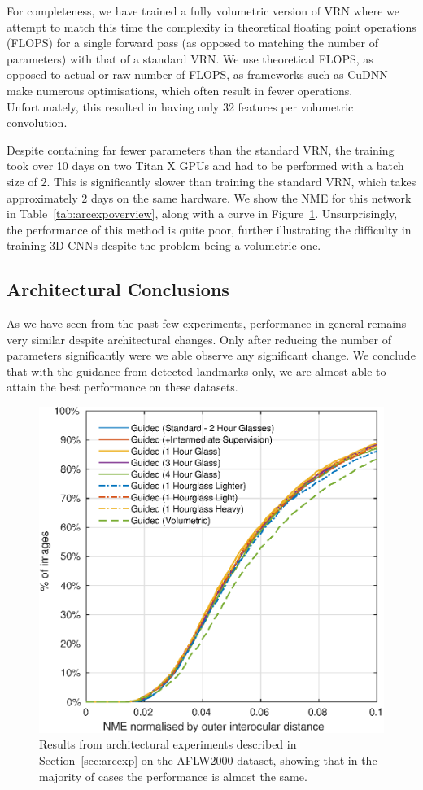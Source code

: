 For completeness, we have trained a fully volumetric version of VRN
where we attempt to match this time the complexity in theoretical
floating point operations (FLOPS) for a single forward pass (as
opposed to matching the number of parameters) with that of a standard
VRN. We use theoretical FLOPS, as opposed to actual or raw number of
FLOPS, as frameworks such as CuDNN make numerous optimisations, which
often result in fewer operations. Unfortunately, this resulted in
having only 32 features per volumetric convolution.

Despite containing far fewer parameters than the standard VRN, the
training took over 10 days on two Titan X GPUs and had to be performed
with a batch size of 2. This is significantly slower than training the
standard VRN, which takes approximately 2 days on the same
hardware. We show the NME for this network in
Table~\ref{tab:arcexpoverview}, along with a curve in
Figure~\ref{fig:additionalexp}. Unsurprisingly, the performance of
this method is quite poor, further illustrating the difficulty in
training 3D CNNs despite the problem being a volumetric one.

\subsection{Architectural Conclusions}
As we have seen from the past few experiments, performance in general
remains very similar despite architectural changes. Only after
reducing the number of parameters significantly were we able observe
any significant change. We conclude that with the guidance from
detected landmarks only, we are almost able to attain the best performance on
these datasets.

\begin{figure}
  \centering
  \includegraphics[width=0.75\linewidth]{curves2/aflw.eps}
  \caption[NME performance from architectural experiments]{Results
    from architectural experiments described in
    Section~\ref{sec:arcexp} on the AFLW2000 dataset, showing that in
    the majority of cases the performance is almost the same.}
  \label{fig:additionalexp}
\end{figure}

